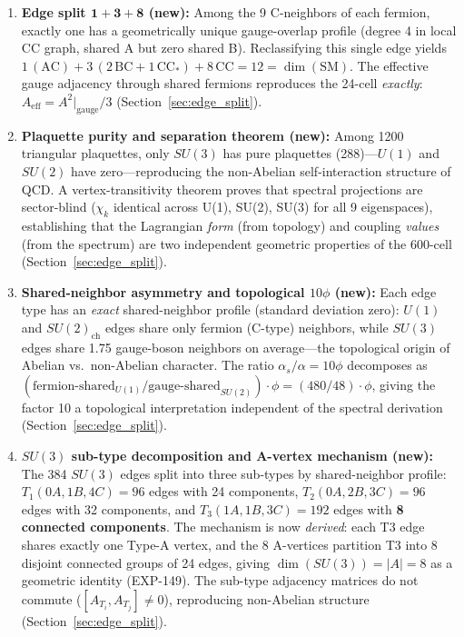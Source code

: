 \documentclass[12pt,a4paper]{article}
\begin{document}
\begin{enumerate}
    \item \textbf{Edge split $\mathbf{1+3+8}$ (new):} Among the 9 C-neighbors of each fermion, exactly one has a geometrically unique gauge-overlap profile (degree 4 in local CC graph, shared A but zero shared B). Reclassifying this single edge yields $1\,(\text{AC}) + 3\,(2\,\text{BC} + 1\,\text{CC}_*) + 8\,\text{CC} = 12 = \dim(\text{SM})$. The effective gauge adjacency through shared fermions reproduces the 24-cell \emph{exactly}: $A_{\text{eff}} = A^2|_{\text{gauge}}/3$ (Section~\ref{sec:edge_split}).

    \item \textbf{Plaquette purity and separation theorem (new):} Among 1200 triangular plaquettes, only $SU(3)$ has pure plaquettes (288)---$U(1)$ and $SU(2)$ have zero---reproducing the non-Abelian self-interaction structure of QCD. A vertex-transitivity theorem proves that spectral projections are sector-blind ($\chi_k$ identical across U(1), SU(2), SU(3) for all 9 eigenspaces), establishing that the Lagrangian \emph{form} (from topology) and coupling \emph{values} (from the spectrum) are two independent geometric properties of the 600-cell (Section~\ref{sec:edge_split}).

    \item \textbf{Shared-neighbor asymmetry and topological $10\phi$ (new):} Each edge type has an \emph{exact} shared-neighbor profile (standard deviation zero): $U(1)$ and $SU(2)_{\text{ch}}$ edges share only fermion (C-type) neighbors, while $SU(3)$ edges share 1.75 gauge-boson neighbors on average---the topological origin of Abelian vs.\ non-Abelian character. The ratio $\alpha_s/\alpha = 10\phi$ decomposes as $(\text{fermion-shared}_{U(1)} / \text{gauge-shared}_{SU(2)}) \cdot \phi = (480/48) \cdot \phi$, giving the factor 10 a topological interpretation independent of the spectral derivation (Section~\ref{sec:edge_split}).

    \item \textbf{$SU(3)$ sub-type decomposition and A-vertex mechanism (new):} The 384 $SU(3)$ edges split into three sub-types by shared-neighbor profile: $T_1(0A,1B,4C) = 96$ edges with 24 components, $T_2(0A,2B,3C) = 96$ edges with 32 components, and $T_3(1A,1B,3C) = 192$ edges with \textbf{8 connected components}. The mechanism is now \emph{derived}: each T3 edge shares exactly one Type-A vertex, and the 8 A-vertices partition T3 into 8 disjoint connected groups of 24 edges, giving $\dim(SU(3)) = |A| = 8$ as a geometric identity (EXP-149). The sub-type adjacency matrices do not commute ($[A_{T_i}, A_{T_j}] \neq 0$), reproducing non-Abelian structure (Section~\ref{sec:edge_split}).
\end{enumerate}
\end{document}
